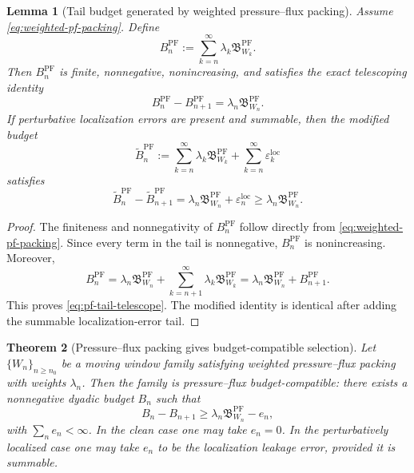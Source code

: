 \documentclass[11pt]{article}
\numberwithin{equation}{section}
\theoremstyle{plain}
\newtheorem{theorem}{Theorem}[section]
\newtheorem{lemma}[theorem]{Lemma}
\theoremstyle{definition}
\theoremstyle{remark}
\newcommand{\PF}{\mathrm{PF}}
\newcommand{\loc}{\mathrm{loc}}
\newcommand{\bfB}{\mathfrak B}
\begin{document}
\begin{lemma}[Tail budget generated by weighted pressure--flux packing]
\label{lem:tail-budget-pf-packing}
Assume \eqref{eq:weighted-pf-packing}.  Define
\begin{equation}
        B_n^{\PF}
        :=
        \sum_{k=n}^{\infty}\lambda_k\bfB^{\PF}_{W_k}.
        \label{eq:pf-tail-budget}
\end{equation}
Then \(B_n^{\PF}\) is finite, nonnegative, nonincreasing, and satisfies the exact telescoping identity
\begin{equation}
        B_n^{\PF}-B_{n+1}^{\PF}
        =
        \lambda_n\bfB^{\PF}_{W_n}.
        \label{eq:pf-tail-telescope}
\end{equation}
If perturbative localization errors are present and summable, then the modified budget
\[
        \widetilde B_n^{\PF}
        :=
        \sum_{k=n}^{\infty}\lambda_k\bfB^{\PF}_{W_k}
        +
        \sum_{k=n}^{\infty}\varepsilon_k^{\loc}
\]
satisfies
\[
        \widetilde B_n^{\PF}-\widetilde B_{n+1}^{\PF}
        =
        \lambda_n\bfB^{\PF}_{W_n}+\varepsilon_n^{\loc}
        \ge
        \lambda_n\bfB^{\PF}_{W_n}.
\]
\end{lemma}

\begin{proof}
The finiteness and nonnegativity of \(B_n^{\PF}\) follow directly from \eqref{eq:weighted-pf-packing}.  Since every term in the tail is nonnegative, \(B_n^{\PF}\) is nonincreasing.  Moreover,
\[
        B_n^{\PF}
        =
        \lambda_n\bfB^{\PF}_{W_n}
        +
        \sum_{k=n+1}^{\infty}\lambda_k\bfB^{\PF}_{W_k}
        =
        \lambda_n\bfB^{\PF}_{W_n}+B_{n+1}^{\PF}.
\]
This proves \eqref{eq:pf-tail-telescope}.  The modified identity is identical after adding the summable localization-error tail.
\end{proof}

\begin{theorem}[Pressure--flux packing gives budget-compatible selection]
\label{thm:pf-packing-budget-compatible}
Let \(\{W_n\}_{n\ge n_0}\) be a moving window family satisfying weighted pressure--flux packing with weights \(\lambda_n\).  Then the family is pressure--flux budget-compatible: there exists a nonnegative dyadic budget \(B_n\) such that
\[
        B_n-B_{n+1}
        \ge
        \lambda_n\bfB^{\PF}_{W_n}-e_n,
\]
with \(\sum_n e_n<\infty\).  In the clean case one may take \(e_n=0\).  In the perturbatively localized case one may take \(e_n\) to be the localization leakage error, provided it is summable.
\end{theorem}
\end{document}
